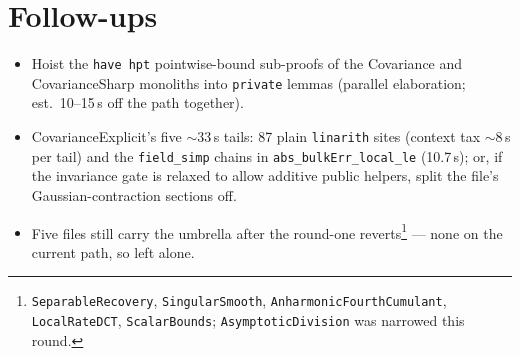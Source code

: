 \documentclass[11pt]{article}
\begin{document}
\section{Follow-ups}

\begin{itemize}[leftmargin=2em]
\item Hoist the \texttt{have hpt} pointwise-bound sub-proofs of the
Covariance and CovarianceSharp monoliths into \texttt{private} lemmas
(parallel elaboration; est.\ 10--15\,s off the path together).
\item CovarianceExplicit's five $\sim$33\,s tails: 87 plain
\texttt{linarith} sites (context tax $\sim$8\,s per tail) and the
\texttt{field\_simp} chains in \texttt{abs\_bulkErr\_local\_le}
(10.7\,s); or, if the invariance gate is relaxed to allow additive
public helpers, split the file's Gaussian-contraction sections off.
\item Five files still carry the umbrella after the round-one
reverts\footnote{\texttt{SeparableRecovery}, \texttt{SingularSmooth},
\texttt{AnharmonicFourthCumulant}, \texttt{LocalRateDCT},
\texttt{ScalarBounds}; \texttt{AsymptoticDivision} was narrowed this
round.} --- none on the current path, so left alone.
\end{itemize}
\end{document}
